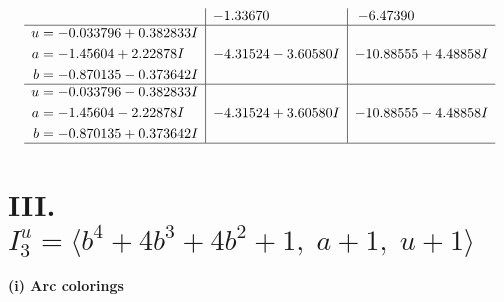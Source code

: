 \documentclass[1p]{elsarticle_modified}
\theoremstyle{definition}
\begin{document}
$$\begin{array}{c|c|c}
 & -1.33670\phantom{ +0.000000I} & -6.47390\phantom{ +0.000000I} \\ \hline\begin{aligned}
u &= -0.033796 + 0.382833 I \\
a &= -1.45604 + 2.22878 I \\
b &= -0.870135 - 0.373642 I\end{aligned}
 & -4.31524 - 3.60580 I & -10.88555 + 4.48858 I \\ \hline\begin{aligned}
u &= -0.033796 - 0.382833 I \\
a &= -1.45604 - 2.22878 I \\
b &= -0.870135 + 0.373642 I\end{aligned}
 & -4.31524 + 3.60580 I & -10.88555 - 4.48858 I\\
 \hline 
 \end{array}$$\newpage\newpage\renewcommand{\arraystretch}{1}
\centering \section*{III. $I^u_{3}= \langle b^4+4 b^3+4 b^2+1,\;a+1,\;u+1 \rangle$}
\flushleft \textbf{(i) Arc colorings}\\
\end{document}
